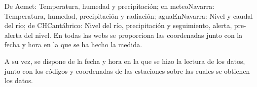 De Aemet: Temperatura, humedad y precipitación; en meteoNavarra: Temperatura, humedad, precipitación y radiación; aguaEnNavarra: Nivel y caudal del río; de CHCantábrico: Nivel del río, precipitación y seguimiento, alerta, pre-alerta del nivel. En todas las webs se proporciona las coordenadas junto con la fecha y hora en la que se ha hecho la medida.

A su vez, se dispone de la fecha y hora en la que se hizo la lectura de los datos, junto con los códigos y coordenadas de las estaciones sobre las cuales se obtienen los datos.